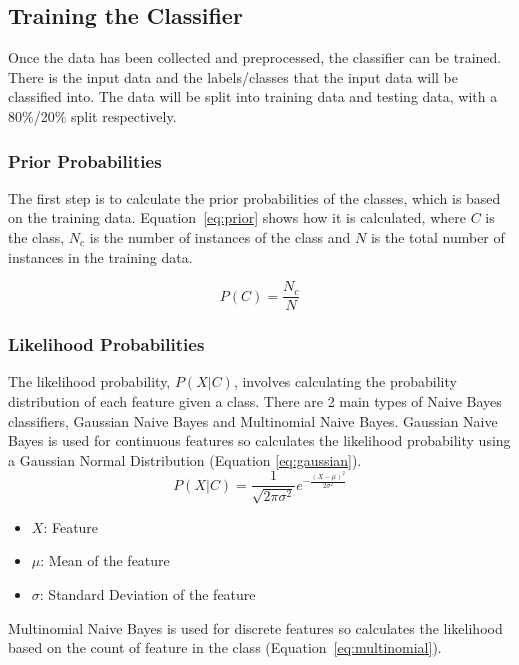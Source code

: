 \documentclass{article}
\begin{document}
\subsection{Training the Classifier}
\label{sec:training}
Once the data has been collected and preprocessed, the classifier can be trained. There is the input data
and the labels/classes that the input data will be classified into.
The data will be split into training data and testing data, with a 80\%/20\% split respectively. 

\subsubsection{Prior Probabilities}
\label{sec:prior}
The first step 
is to calculate the prior probabilities of the classes, which is based on the training data. Equation~\ref{eq:prior}
shows how it is calculated, where $C$ is the class, $N_c$ is the number of instances of the class and $N$ is the 
total number of instances in the training data.

\begin{equation}
    \label{eq:prior}
    P(C) = \frac{N_c}{N}
\end{equation}


\subsubsection{Likelihood Probabilities}
\label{sec:likelihood}
The likelihood probability, $P(X | C)$, involves calculating the probability distribution of each feature given a class.
There are 2 main types of Naive Bayes classifiers, Gaussian Naive Bayes and Multinomial Naive Bayes. Gaussian Naive Bayes
is used for continuous features so calculates the likelihood probability using a Gaussian Normal Distribution (Equation
\ref{eq:gaussian}).
\begin{equation}
    \label{eq:gaussian}
    P(X | C) = \frac{1}{\sqrt{2\pi\sigma^2}}e^{-\frac{(X-\mu)^2}{2\sigma^2}}
\end{equation}

\begin{itemize}
    \item $X$: Feature
    \item $\mu$: Mean of the feature
    \item $\sigma$: Standard Deviation of the feature
\end{itemize}

Multinomial Naive Bayes is used for discrete features so calculates the likelihood based on 
the count of feature in the class (Equation~\ref{eq:multinomial}). 
\end{document}
